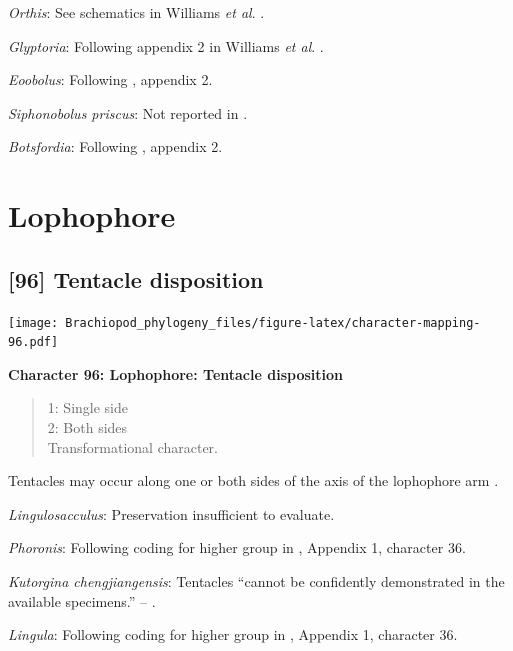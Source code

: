 \documentclass[openany]{book}
\theoremstyle{definition}
\theoremstyle{definition}
\theoremstyle{definition}
\theoremstyle{remark}
\begin{document}
\emph{Orthis}: See schematics in Williams \emph{et al}.
\citeyearpar{Williams2000BrachiopodaLinguliformea}.

\emph{Glyptoria}: Following appendix 2 in Williams \emph{et al}.
\citeyearpar{Williams1998Thediversity}.

\emph{Eoobolus}: Following \citet{Williams1998Thediversity}, appendix 2.

\emph{Siphonobolus priscus}: Not reported in
\citet{Williams2000BrachiopodaLinguliformea}.

\emph{Botsfordia}: Following \citet{Williams1998Thediversity}, appendix
2.

\hypertarget{lophophore}{%
\section{Lophophore}\label{lophophore}}

\hypertarget{tentacle-disposition}{%
\subsection*{{[}96{]} Tentacle disposition}\label{tentacle-disposition}}

\texttt{[image: Brachiopod\_phylogeny\_files/figure-latex/character-mapping-96.pdf]}

\textbf{Character 96: Lophophore: Tentacle disposition}

\begin{quote}
1: Single side\\
2: Both sides\\
Transformational character.
\end{quote}

Tentacles may occur along one or both sides of the axis of the
lophophore arm \citep{Carlson1995Phylogeneticrelationships}.

\emph{Lingulosacculus}: Preservation insufficient to evaluate.

\emph{Phoronis}: Following coding for higher group in
\citet{Carlson1995Phylogeneticrelationships}, Appendix 1, character 36.

\emph{Kutorgina chengjiangensis}: Tentacles ``cannot be confidently
demonstrated in the available specimens.'' --
\citet{Zhang2007Rhynchonelliformeanbrachiopods}.

\emph{Lingula}: Following coding for higher group in
\citet{Carlson1995Phylogeneticrelationships}, Appendix 1, character 36.
\end{document}
